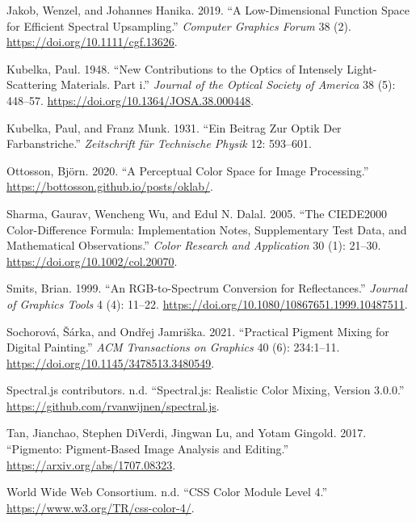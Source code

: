 \documentclass[
  10pt,
  twocolumn]{article}
\newlength{\cslhangindent}
\newlength{\cslentryspacingunit} %
\newenvironment{CSLReferences}[2] %
 {%
  \setlength{\parindent}{0pt}
  \ifodd #1
  \let\oldpar\par
  \def\par{\hangindent=\cslhangindent\oldpar}
  \fi
  \setlength{\parskip}{#2\cslentryspacingunit}
 }%
 {}
\begin{document}
\begin{CSLReferences}{1}{0}
\leavevmode{}%
Jakob, Wenzel, and Johannes Hanika. 2019. {``A Low-Dimensional Function
Space for Efficient Spectral Upsampling.''} \emph{Computer Graphics
Forum} 38 (2). \url{https://doi.org/10.1111/cgf.13626}.

\leavevmode{}%
Kubelka, Paul. 1948. {``New Contributions to the Optics of Intensely
Light-Scattering Materials. Part i.''} \emph{Journal of the Optical
Society of America} 38 (5): 448--57.
\url{https://doi.org/10.1364/JOSA.38.000448}.

\leavevmode{}%
Kubelka, Paul, and Franz Munk. 1931. {``Ein Beitrag Zur Optik Der
Farbanstriche.''} \emph{Zeitschrift f{ü}r Technische Physik} 12:
593--601.

\leavevmode{}%
Ottosson, Björn. 2020. {``A Perceptual Color Space for Image
Processing.''} \url{https://bottosson.github.io/posts/oklab/}.

\leavevmode{}%
Sharma, Gaurav, Wencheng Wu, and Edul N. Dalal. 2005. {``The {CIEDE2000}
Color-Difference Formula: Implementation Notes, Supplementary Test Data,
and Mathematical Observations.''} \emph{Color Research and Application}
30 (1): 21--30. \url{https://doi.org/10.1002/col.20070}.

\leavevmode{}%
Smits, Brian. 1999. {``An {RGB}-to-Spectrum Conversion for
Reflectances.''} \emph{Journal of Graphics Tools} 4 (4): 11--22.
\url{https://doi.org/10.1080/10867651.1999.10487511}.

\leavevmode{}%
Sochorová, Šárka, and Ondřej Jamriška. 2021. {``Practical Pigment Mixing
for Digital Painting.''} \emph{ACM Transactions on Graphics} 40 (6):
234:1--11. \url{https://doi.org/10.1145/3478513.3480549}.

\leavevmode{}%
Spectral.js contributors. n.d. {``Spectral.js: Realistic Color Mixing,
Version 3.0.0.''} \url{https://github.com/rvanwijnen/spectral.js}.

\leavevmode{}%
Tan, Jianchao, Stephen DiVerdi, Jingwan Lu, and Yotam Gingold. 2017.
{``Pigmento: Pigment-Based Image Analysis and Editing.''}
\url{https://arxiv.org/abs/1707.08323}.

\leavevmode{}%
World Wide Web Consortium. n.d. {``{CSS} Color Module Level 4.''}
\url{https://www.w3.org/TR/css-color-4/}.

\end{CSLReferences}
\end{document}
